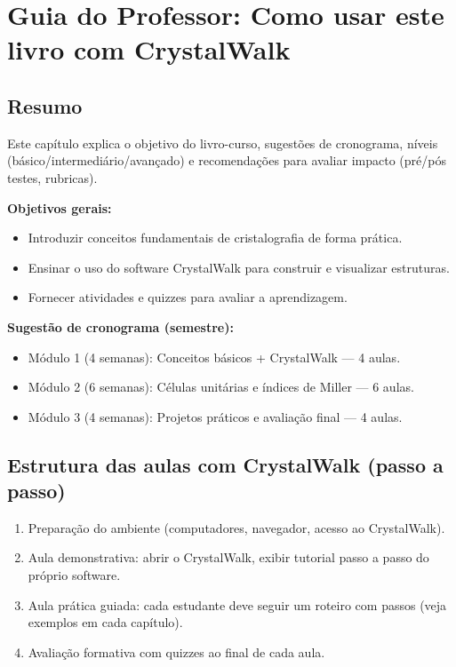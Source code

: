 \chapter{Guia do Professor: Como usar este livro com CrystalWalk}

\section*{Resumo}
Este capítulo explica o objetivo do livro-curso, sugestões de cronograma, níveis (básico/intermediário/avançado) e recomendações para avaliar impacto (pré/pós testes, rubricas).

\begin{lessonplan}
\textbf{Objetivos gerais:}
\begin{itemize}
  \item Introduzir conceitos fundamentais de cristalografia de forma prática.
  \item Ensinar o uso do software CrystalWalk para construir e visualizar estruturas.
  \item Fornecer atividades e quizzes para avaliar a aprendizagem.
\end{itemize}

\textbf{Sugestão de cronograma (semestre):}
\begin{itemize}
  \item Módulo 1 (4 semanas): Conceitos básicos + CrystalWalk — 4 aulas.
  \item Módulo 2 (6 semanas): Células unitárias e índices de Miller — 6 aulas.
  \item Módulo 3 (4 semanas): Projetos práticos e avaliação final — 4 aulas.
\end{itemize}
\end{lessonplan}

\section*{Estrutura das aulas com CrystalWalk (passo a passo)}
\begin{enumerate}
  \item Preparação do ambiente (computadores, navegador, acesso ao CrystalWalk).
  \item Aula demonstrativa: abrir o CrystalWalk, exibir tutorial passo a passo do próprio software.
  \item Aula prática guiada: cada estudante deve seguir um roteiro com passos (veja exemplos em cada capítulo).
  \item Avaliação formativa com quizzes ao final de cada aula.
\end{enumerate}
